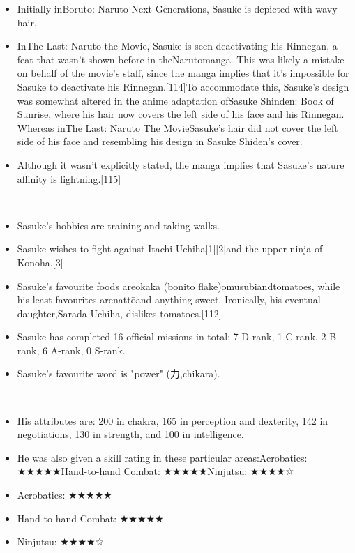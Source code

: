 \documentclass[a4paper,12pt]{article}
\begin{document}
\begin{itemize}
\item Initially inBoruto: Naruto Next Generations, Sasuke is depicted with wavy hair.
\item InThe Last: Naruto the Movie, Sasuke is seen deactivating his Rinnegan, a feat that wasn't shown before in theNarutomanga. This was likely a mistake on behalf of the movie's staff, since the manga implies that it's impossible for Sasuke to deactivate his Rinnegan.[114]To accommodate this, Sasuke's design was somewhat altered in the anime adaptation ofSasuke Shinden: Book of Sunrise, where his hair now covers the left side of his face and his Rinnegan. Whereas inThe Last: Naruto The MovieSasuke's hair did not cover the left side of his face and resembling his design in Sasuke Shiden's cover.
\item Although it wasn't explicitly stated, the manga implies that Sasuke's nature affinity is lightning.[115]
\end{itemize}\\ \par \vspace{0.5cm}

\begin{itemize}
\item Sasuke's hobbies are training and taking walks.
\item Sasuke wishes to fight against Itachi Uchiha[1][2]and the upper ninja of Konoha.[3]
\item Sasuke's favourite foods areokaka (bonito flake)omusubiandtomatoes, while his least favourites arenattōand anything sweet. Ironically, his eventual daughter,Sarada Uchiha, dislikes tomatoes.[112]
\item Sasuke has completed 16 official missions in total: 7 D-rank, 1 C-rank, 2 B-rank, 6 A-rank, 0 S-rank.
\item Sasuke's favourite word is "power" (力,chikara).
\end{itemize}\\ \par \vspace{0.5cm}

\begin{itemize}
\item His attributes are: 200 in chakra, 165 in perception and dexterity, 142 in negotiations, 130 in strength, and 100 in intelligence.
\item He was also given a skill rating in these particular areas:Acrobatics: ★★★★★Hand-to-hand Combat: ★★★★★Ninjutsu: ★★★★☆
\item Acrobatics: ★★★★★
\item Hand-to-hand Combat: ★★★★★
\item Ninjutsu: ★★★★☆
\end{itemize}\\ \par \vspace{0.5cm}
\end{document}
